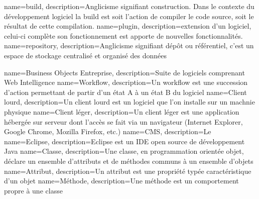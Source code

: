 

{
	name={build},
	description={Anglicisme signifiant construction. Dans le contexte du développement logiciel la build est soit l'action de compiler le code source, soit le résultat de cette compilation.}
}
{
	name={plugin},
	description={extension d'un logiciel, celui-ci complète son fonctionnement est apporte de nouvelles fonctionnalités.}
}
{
	name={repository},
	description={Anglicisme signifiant dépôt ou référentiel, c'est un espace de stockage centralisé et organisé des données}
}

{
	name={Business Objects Entreprise},
	description={Suite de logiciels comprenant Web Intelligence}
}
{
	name={Workflow},
	description={Un workflow est une succession d'action permettant de partir d'un état A à un état B du logiciel}
}
{
	name={Client lourd},
	description={Un client lourd est un logiciel que l'on installe sur un machnie physique}
}
{
	name={Client léger},
	description={Un client léger est une application hébergée sur serveur dont l'accès se fait via un navigateur (Internet Explorer, Google Chrome, Mozilla Firefox, etc.)}
}
{
	name={CMS},
	description={Le }
}
{
	name={Eclipse},
	description={Eclipse est un IDE open source de développement Java}
}
{
	name={Classe},
	description={Une classe, en programmation orientée objet, déclare un ensemble d'attributs et de méthodes communs à un ensemble d'objets}
}
{
	name={Attribut},
	description={Un attribut est une propriété typée caractéristique d'un objet}
}
{
	name={M\'{e}thode},
	description={Une méthode est un comportement propre à une classe}
}



